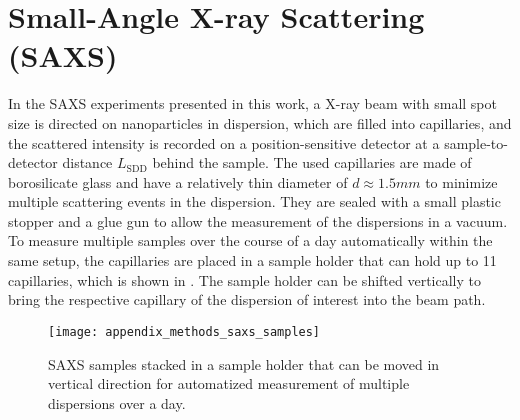 \documentclass[\main/dresen_thesis.tex]{subfiles}
\begin{document}
  \section{Small-Angle X-ray Scattering (SAXS)}
    \label{app:methods:saxs}
    In the SAXS experiments presented in this work, a X-ray beam with small spot size is directed on nanoparticles in dispersion, which are filled into capillaries, and the scattered intensity is recorded on a position-sensitive detector at a sample-to-detector distance $L_\mathrm{SDD}$ behind the sample.
    The used capillaries are made of borosilicate glass and have a relatively thin diameter of $d \approx 1.5\unit{mm}$ to minimize multiple scattering events in the dispersion.
    They are sealed with a small plastic stopper and a glue gun to allow the measurement of the dispersions in a vacuum.
    To measure multiple samples over the course of a day automatically within the same setup, the capillaries are placed in a sample holder that can hold up to 11 capillaries, which is shown in .
    The sample holder can be shifted vertically to bring the respective capillary of the dispersion of interest into the beam path.
    \begin{figure}[tb]
      \centering
      \texttt{[image: appendix\_methods\_saxs\_samples]}
      \caption{\label{fig:appendix:methods:saxs:samples} SAXS samples stacked in a sample holder that can be moved in vertical direction for automatized measurement of multiple dispersions over a day. }
    \end{figure}
\end{document}
